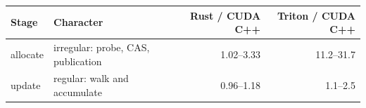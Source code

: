 \begin{tabular}{llrr}
\toprule
Stage & Character & Rust / CUDA C++ & Triton / CUDA C++ \\
\midrule
allocate & irregular: probe, CAS, publication & 1.02--3.33 & 11.2--31.7 \\
update & regular: walk and accumulate & 0.96--1.18 & 1.1--2.5 \\
\bottomrule
\end{tabular}
